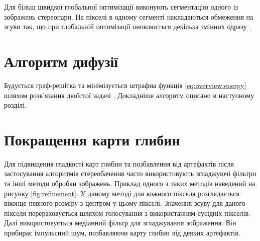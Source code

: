 Для більш швидкої глобальної оптимізації
виконують сегментацію одного із зображень стереопари.
На пікселі в одному сегменті накладаються обмеження на зсуви так,
що при глобальній оптимізації оновлюється декілька змінних одразу
\cite{overview:ferg:graphcut}.

\section{Алгоритм дифузії}

Будується граф-решітка та мінімізується штрафна функція
\eqref{eq:overview:energy}
шляхом розв'язання двоїстої задачі
\cite{overview:savchynskyy:diffusion}.
Докладніше алгоритм описано в наступному розділі.

\section{Покращення карти глибин}

Для підвищення гладкості карт глибин та позбавлення від артефактів
після застосування алгоритмів стереобачення
часто використовують згладжуючі фільтри та інші методи обробки зображень.
Приклад одного з таких методів \cite{refinement}
наведений на рисунку \ref{fig:refinement}.
У даному методі для кожного пікселя розглядається
віконце певного розміру з центром у цьому пікселі.
Значення зсуву для даного пікселя перераховується шляхом голосування
з використанням сусідніх пікселів.
Далі використовується медіанний фільтр для згладжування зображення.
Він прибирає імпульсний шум, позбавляючи карту глибин від деяких артефактів.

